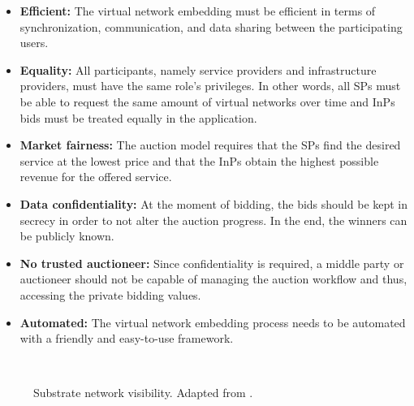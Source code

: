 \begin{itemize}
    \item \textbf{Efficient:} The virtual network embedding must be efficient in terms of synchronization, communication, and data sharing between the participating users.
    \item \textbf{Equality:} All participants, namely service providers and infrastructure providers, must have the same role's privileges. In other words, all SPs must be able to request the same amount of virtual networks over time and InPs bids must be treated equally in the application.
    \item \textbf{Market fairness:} The auction model requires that the SPs find the desired service at the lowest price and that the InPs obtain the highest possible revenue for the offered service.
    \item \textbf{Data confidentiality:} At the moment of bidding, the bids should be kept in secrecy in order to not alter the auction progress. In the end, the winners can be publicly known.
    \item \textbf{No trusted auctioneer:} Since confidentiality is required, a middle party or auctioneer should not be capable of managing the auction workflow and thus, accessing the private bidding values.
     \item \textbf{Automated:} The virtual network embedding process needs to be automated with a friendly and easy-to-use framework.
\end{itemize}

\begin{figure}[bth]
	\myfloatalign
	 \quad
	 \\
	\caption{Substrate network visibility. Adapted from \citep{dietrich2015multi}.}
	\label{fig:problem}
\end{figure}

